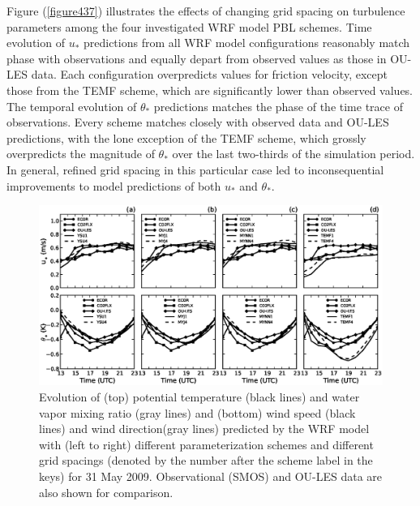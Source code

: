 Figure (\autoref{figure437}) illustrates the effects of changing grid spacing on turbulence parameters among the four investigated WRF model PBL schemes. Time evolution of $u_*$ predictions from all WRF model configurations reasonably match phase with observations and equally depart from observed values as those in OU-LES data. Each configuration overpredicts values for friction velocity, except those from the TEMF scheme, which are significantly lower than observed values. The temporal evolution of $\theta_*$ predictions matches the phase of the time trace of observations. Every scheme matches closely with observed data and OU-LES predictions, with the lone exception of the TEMF scheme, which grossly overpredicts the magnitude of $\theta_*$ over the last two-thirds of the simulation period. In general, refined grid spacing in this particular case led to inconsequential improvements to model predictions of both $u_*$ and $\theta_*$. 


\begin{figure}[ht!]
\begin{center}
\includegraphics[width=\textwidth]{figures/chapter4/ust_tst_grid_20090531}
\end{center}
\caption{Evolution of (top) potential temperature (black lines) and water vapor mixing ratio (gray lines) and (bottom) wind speed (black lines) and wind direction(gray lines) predicted by the WRF model with (left to right) different parameterization schemes and different grid spacings (denoted by the number after the scheme label in the keys) for 31 May 2009. Observational (SMOS) and OU-LES data are also shown for comparison.}
\label{figure437}
\end{figure}


